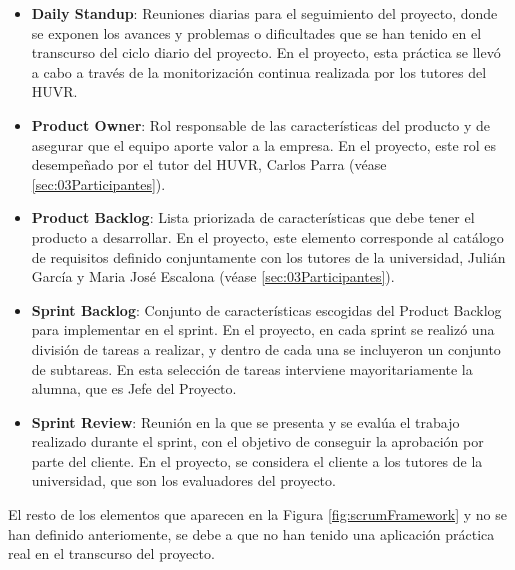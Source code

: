 \begin{itemize}
    \item \textbf{Daily Standup}: Reuniones diarias para el seguimiento del proyecto, donde se exponen los avances y problemas o dificultades que se han tenido en el transcurso del ciclo diario del proyecto. En el proyecto, esta práctica se llevó a cabo a través de la monitorización continua realizada por los tutores del HUVR.
    \item \textbf{Product Owner}: Rol responsable de las características del producto y de asegurar que el equipo aporte valor a la empresa. En el proyecto, este rol es desempeñado por el tutor del HUVR, Carlos Parra (véase \ref{sec:03Participantes}).
    \item \textbf{Product Backlog}: Lista priorizada de características que debe tener el producto a desarrollar. En el proyecto, este elemento corresponde al catálogo de requisitos definido conjuntamente con los tutores de la universidad, Julián García y Maria José Escalona (véase \ref{sec:03Participantes}).
    \item \textbf{Sprint Backlog}: Conjunto de características escogidas del Product Backlog para implementar en el sprint. En el proyecto, en cada sprint se realizó una división de tareas a realizar, y dentro de cada una se incluyeron un conjunto de subtareas. En esta selección de tareas interviene mayoritariamente la alumna, que es Jefe del Proyecto.
    \item \textbf{Sprint Review}: Reunión en la que se presenta y se evalúa el trabajo realizado durante el sprint, con el objetivo de conseguir la aprobación por parte del cliente. En el proyecto, se considera el cliente a los tutores de la universidad, que son los evaluadores del proyecto.
\end{itemize}

El resto de los elementos que aparecen en la Figura \ref{fig:scrumFramework} y no se han definido anteriomente, se debe a que no han tenido una aplicación práctica real en el transcurso del proyecto.



